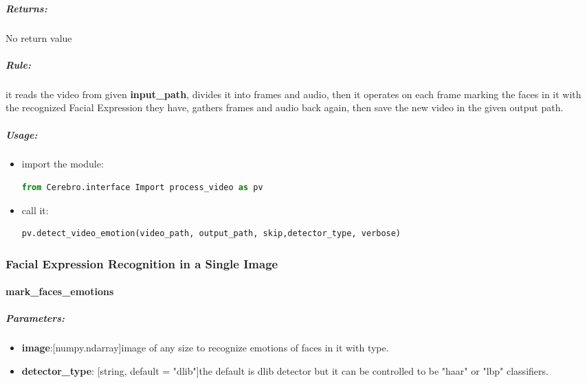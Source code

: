 \subparagraph{Returns:} 
\begin{changemargin}{1cm}{0cm} 
No return value
\end{changemargin}

\subparagraph{Rule:}
\begin{changemargin}{1cm}{0cm} 
it reads the video from given \textbf{input\_path}, divides it into frames and audio, then it operates on each frame marking the faces in it with the recognized Facial Expression they have, gathers frames and audio back again, then save the new video in the given output path.
\end{changemargin}

\subparagraph{Usage:}
\begin{changemargin}{0.5cm}{0cm} 
	\begin{itemize}
		\item import the module:
		\begin{lstlisting}[language=Python]
		from Cerebro.interface Import process_video as pv\end{lstlisting}
		\item call it:
		\begin{lstlisting}[language=Python]
		pv.detect_video_emotion(video_path, output_path, skip,detector_type, verbose)\end{lstlisting}
	\end{itemize}
\end{changemargin}

\subsubsection{Facial Expression Recognition in a Single Image}
\paragraph{mark\_faces\_emotions}

\subparagraph{Parameters:}
\begin{changemargin}{0.5cm}{0cm}
\begin{itemize}
	\item \textbf{image}:[numpy.ndarray]image of any size to recognize emotions of faces in it with type.
	\item \textbf{detector\_type}: [string, default = "dlib"]the default is dlib detector but it can be controlled to be "haar" or "lbp" classifiers.	
\end{itemize}
\end{changemargin}

